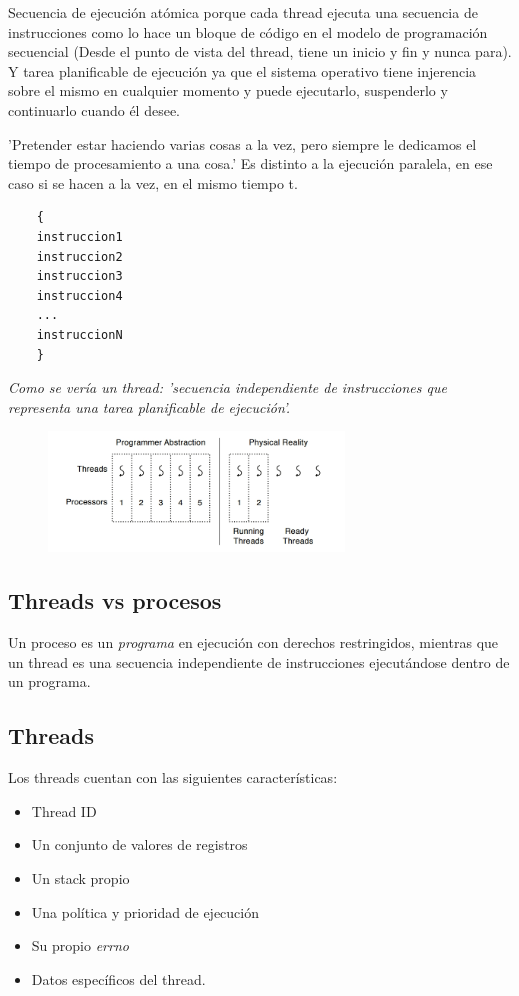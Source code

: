 \documentclass[titlepage,a4paper]{article}
\begin{document}
Secuencia de ejecución atómica porque cada thread ejecuta una secuencia de instrucciones como lo hace un bloque de código en el modelo de programación secuencial (Desde el punto de vista del thread, tiene un inicio y fin y nunca para). Y tarea planificable de ejecución ya que el sistema operativo tiene injerencia sobre el mismo en cualquier momento y puede ejecutarlo, suspenderlo y continuarlo cuando él desee.

'Pretender estar haciendo varias cosas a la vez, pero siempre le dedicamos el tiempo de procesamiento a una cosa.' Es distinto a la ejecución paralela, en ese caso si se hacen a la vez, en el mismo tiempo t.


\begin{verbatim}
    {
    instruccion1
    instruccion2
    instruccion3
    instruccion4
    ...
    instruccionN
    }
\end{verbatim}
\begin{center}\textit{Como se vería un thread: 'secuencia independiente de instrucciones que representa una tarea planificable de ejecución'.}\end{center}

\begin{figure}[!htb]
    \centering
    \includegraphics[width=0.7\textwidth]{ImagenesApunte/threads_abstraction.jpg}
\end{figure}

\subsection*{Threads vs procesos}

Un proceso es un \emph{programa} en ejecución con derechos restringidos, mientras que un thread es una secuencia independiente de instrucciones ejecutándose dentro de un programa.

\subsection*{Threads}
Los threads cuentan con las siguientes características:
\begin{itemize}
    \item Thread ID
    \item Un conjunto de valores de registros
    \item Un stack propio
    \item Una política y prioridad de ejecución
    \item Su propio \emph{errno}
    \item Datos específicos del thread.
\end{itemize}
\end{document}
